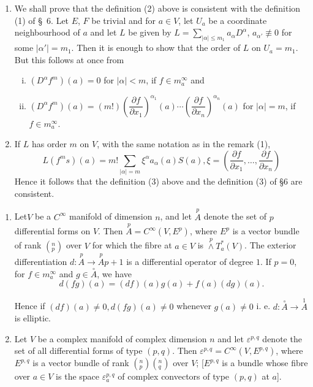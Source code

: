 \begin{remarks}
  \begin{enumerate}[(1)]
  \item We shall prove that the definition (2) above is consistent
    with the definition (1) of \S\ 6. Let $E$, $F$ be trivial and for
    $a \in V$, let $U_a$ be a coordinate neighbourhood of $a$ and let
    $L$ be given by $L = \sum\limits_{|\alpha | \leq m_1} a_\alpha
    D^\alpha$, $a_{\alpha'} \nequiv 0$ for some $| \alpha'| =
    m_1$. Then it is enough to show that the order of $L$ on $U_a =
    m_1$. But this follows at once from  
    \begin{enumerate}[(i)]
    \item $(D^\alpha f^m) (a) = 0$ for $|\alpha| < m$, if $f \in m^\infty_a$ and
    \item $(D^\alpha f^m) (a) = (m!)(\dfrac{\partial f}{\partial
      x_1})^{\alpha_1} (a) \cdots (\dfrac{\partial f}{\partial
      x_n})^{\alpha_n} (a)$ for $|\alpha| = m$, if $f \in
      m^\infty_a$. 
    \end{enumerate}
  \item If $L$ has order $m$ on $V$, with the same notation as in the
    remark (1), 
  $$
  L(f^m s) (a) = m! \sum_{|\alpha | = m} \xi^\alpha a_\alpha (a) S(a),
  \xi= \left(\frac{\partial f}{\partial x_1}, \ldots , \frac{\partial
    f}{\partial x_n} \right)
  $$
  Hence it follows that the definition (3) above and the definition (3)
  of \S 6 are consistent. 
  \end{enumerate}
\end{remarks}

\begin{examples*}
  \begin{enumerate}[(1)]
  \item Let\pageoriginale $V$ be a $C^\infty$ manifold of dimension $n$, and let
    $\overset{p}{A}$ denote the set of $p$ differential forms on
    $V$. Then $\overset{p}{A} =
    C^\infty (V, E^p)$, where $E^p$ is a vector bundle of rank
    $(^n_p)$ over $V$ for which the fibre at $a \in V$ is $\overset{p}{\wedge}
    T^*_a (V)$. The exterior differentiation $d : \overset{p}{A} \to
    \overset{p}{A} p+1$ is
    a differential operator of degree $1$. If $p = 0$, for $f \in
    m^\infty_a$ and $g \in \overset{\circ}{A}$, we have 
    $$
    d(fg) (a) = (df) (a) g(a) + f(a) (dg) (a).
    $$

    Hence if $(df) (a) \neq 0, d(fg) (a) \neq 0$ whenever $g(a) \neq
    0$ i. e. $d : \overset{\circ}{A} \to \overset{1}{A}$ is elliptic. 
  \item Let $V$ be a complex manifold of complex dimension $n$ and let
    $\varepsilon^{p, q}$ denote the set of all differential forms of
    type $(p, q)$. Then $\varepsilon^{p, q} = C^{\infty} (V, E^{p,
      q})$, where $E^{p, q}$ is a vector bundle of rank $(^n_p)
    (^n_q)$ over $V$; [$ E^{p, q}$ is a bundle whose fibre over $a \in
      V$ is the space $\varepsilon^{p, q}_a$ of complex convectors of
      type $(p, q)$ at $a$]. 
  \end{enumerate}
\end{examples*}

